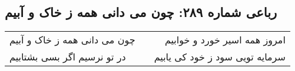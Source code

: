 \begin{center}
\section*{رباعی شماره ۲۸۹: چون می دانی همه ز خاک و آبیم}
\label{sec:sh289}
\begin{longtable}{l p{0.5cm} r}
چون می دانی همه ز خاک و آبیم
&&
امروز همه اسیر خورد و خوابیم
\\
در تو نرسیم اگر بسی بشتابیم
&&
سرمایه تویی سود ز خود کی یابیم
\\
\end{longtable}
\end{center}
